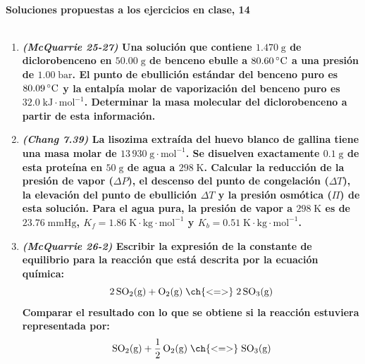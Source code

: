 \documentclass[a4paper,12pt]{article}
\begin{document}

\begin{center}
\HRule \\[0.4cm]
{ \bfseries Soluciones propuestas a los ejercicios en clase, 14}\\ %
\HRule \\[0.4cm]
\end{center}


\begin{enumerate}

 \item \textbf{\textit{(McQuarrie 25-27)} Una soluci\'on que contiene $1.470\;\mbox{g}$ de diclorobenceno en $50.00\;\mbox{g}$ de benceno ebulle a $80.60\,\celsius$ a una presi\'on de $1.00\;\mbox{bar}$. El punto de ebullici\'on est\'andar del benceno puro es $80.09\,\celsius$ y la entalp\'ia molar de vaporizaci\'on del benceno puro es $32.0\;\mbox{kJ}\cdot\mbox{mol}^{-1}$. Determinar la masa molecular del diclorobenceno a partir de esta informaci\'on.} %



 \item \textbf{\textit{(Chang 7.39)} La lisozima extra\'ida del huevo blanco de gallina tiene una masa molar de $13\,930\;\mbox{g}\cdot\mbox{mol}^{-1}$. Se disuelven exactamente $0.1\;\mbox{g}$ de esta prote\'ina en $50\;\mbox{g}$ de agua a $298\;\mbox{K}$. Calcular la reducci\'on de la presi\'on de vapor ($\Delta P$), el descenso del punto de congelaci\'on ($\Delta T$), la elevaci\'on del punto de ebullici\'on $\Delta T$ y la presi\'on osm\'otica ($\Pi$) de esta soluci\'on. Para el agua pura, la presi\'on de vapor a $298\;\mbox{K}$ es de $23.76\;\mbox{mmHg}$, $K_f=1.86\;\mbox{K}\cdot\mbox{kg}\cdot\mbox{mol}^{-1}$ y $K_b=0.51\;\mbox{K}\cdot\mbox{kg}\cdot\mbox{mol}^{-1}$.} %



 \item \textbf{\textit{(McQuarrie 26-2)} Escribir la expresi\'on de la constante de equilibrio para la reacci\'on que est\'a descrita por la ecuaci\'on qu\'imica:}
$$2\,\mbox{SO}_2\mbox{(g)}+\mbox{O}_2\mbox{(g)}\;\ch{ <=> }\;2\,\mbox{SO}_3\mbox{(g)}$$
\textbf{Comparar el resultado con lo que se obtiene si la reacci\'on estuviera representada por:}
$$\mbox{SO}_2\mbox{(g)}+\frac{1}{2}\,\mbox{O}_2\mbox{(g)}\;\ch{ <=> }\;\mbox{SO}_3\mbox{(g)}$$ %




\end{enumerate}
\end{document}
